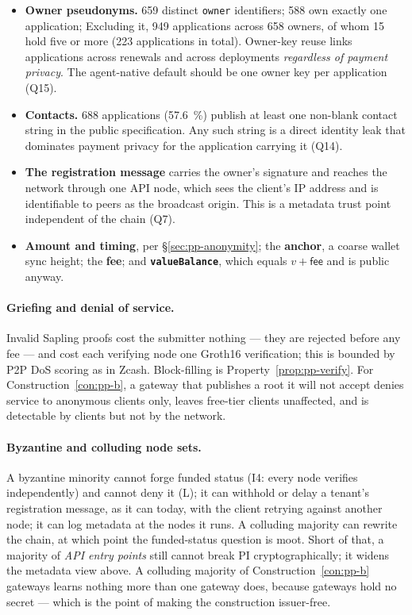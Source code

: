 \begin{itemize}
  \item \textbf{Owner pseudonyms.} \num{659} distinct \texttt{owner} identifiers; \num{588} own
    exactly one application;  Excluding it, \num{949} applications across \num{658} owners, of whom
    \num{15} hold five or more (\num{223} applications in total). Owner-key reuse links applications
    across renewals and across deployments \emph{regardless of payment privacy}. The agent-native
    default should be one owner key per application (Q15).
  \item \textbf{Contacts.} \num{688} applications (\qty{57.6}{\percent}) publish at least one
    non-blank contact string in the public specification. Any such string is a direct identity leak
    that dominates payment privacy for the application carrying it (Q14).
  \item \textbf{The registration message} carries the owner's signature and reaches the network
    through one API node, which sees the client's IP address and is identifiable to peers as the
    broadcast origin. This is a metadata trust point independent of the chain (Q7).
  \item \textbf{Amount and timing}, per \S\ref{sec:pp-anonymity}; the \textbf{anchor}, a coarse wallet
    sync height; the \textbf{fee}; and \textbf{\texttt{valueBalance}}, which equals $v + \mathsf{fee}$
    and is public anyway.
\end{itemize}

\paragraph{Griefing and denial of service.} Invalid Sapling proofs cost the submitter nothing --- they
are rejected before any fee --- and cost each verifying node one Groth16 verification; this is bounded
by P2P DoS scoring as in Zcash. Block-filling is Property~\ref{prop:pp-verify}. For
Construction~\ref{con:pp-b}, a gateway that publishes a root it will not accept denies service to
anonymous clients only, leaves free-tier clients unaffected, and is detectable by clients but not by
the network.

\paragraph{Byzantine and colluding node sets.} A byzantine minority cannot forge funded status
(I4: every node verifies independently) and cannot deny it (L); it can withhold or delay a tenant's
registration message, as it can today, with the client retrying against another node; it can log
metadata at the nodes it runs. A colluding majority can rewrite the chain, at which point the
funded-status question is moot. Short of that, a majority of \emph{API entry points} still cannot
break PI cryptographically; it widens the metadata view above. A colluding majority of
Construction~\ref{con:pp-b} gateways learns nothing more than one gateway does, because gateways hold
no secret --- which is the point of making the construction issuer-free.

